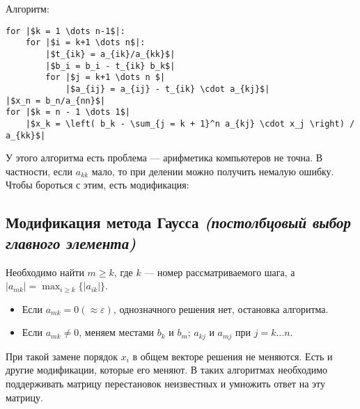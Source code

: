 Алгоритм:
\renewcommand{\theFancyVerbLine}{\sffamily \small\arabic{FancyVerbLine}}
\begin{verbatim}
for |$k = 1 \dots n-1$|:
    for |$i = k+1 \dots n$|:
        |$t_{ik} = a_{ik}/a_{kk}$|
        |$b_i = b_i - t_{ik} b_k$|
        for |$j = k+1 \dots n $|
            |$a_{ij} = a_{ij} - t_{ik} \cdot a_{kj}$|
|$x_n = b_n/a_{nn}$|
for |$k = n - 1 \dots 1$|
    |$x_k = \left( b_k - \sum_{j = k + 1}^n a_{kj} \cdot x_j \right) / a_{kk}$|
\end{verbatim}

У этого алгоритма есть проблема --- арифметика компьютеров не точна. В частности, если \(a_{kk}\) мало, то при делении можно получить немалую ошибку. Чтобы бороться с этим, есть модификация:

\subsection{Модификация метода Гаусса \textit{(постолбцовый выбор главного элемента)}}

Необходимо найти \(m \geq k\), где \(k\) --- номер рассматриваемого шага, а \(|a_{mk}| = \max_{i \geq k} \{|a_{ik}|\} \).

\begin{itemize}
    \item Если \(a_{mk} = 0 (\approx \varepsilon)\), однозначного решения нет, остановка алгоритма.
    \item Если \(a_{mk} \neq 0\), меняем местами \(b_k\) и \(b_m\); \(a_{kj}\) и \(a_{mj}\) при \(j = k \dots n\).
\end{itemize}

При такой замене порядок \(x_i\) в общем векторе решения не меняются. Есть и другие модификации, которые его меняют. В таких алгоритмах необходимо поддерживать матрицу перестановок неизвестных и умножить ответ на эту матрицу.